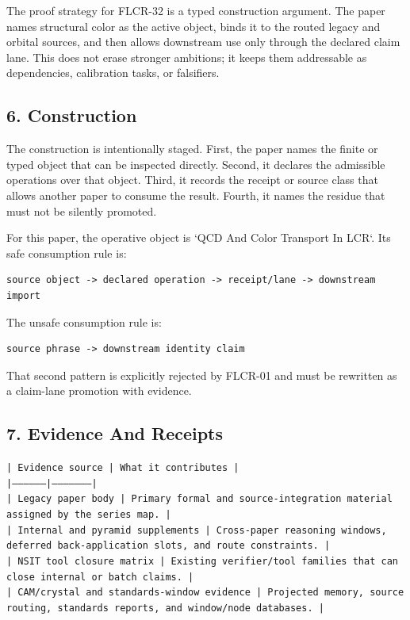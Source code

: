 \documentclass[11pt]{article}
\begin{document}
The proof strategy for FLCR-32 is a typed construction argument. The paper names structural color as the active object, binds it to the routed legacy and orbital sources, and then allows downstream use only through the declared claim lane. This does not erase stronger ambitions; it keeps them addressable as dependencies, calibration tasks, or falsifiers.

\subsection*{6. Construction}

The construction is intentionally staged. First, the paper names the finite or
typed object that can be inspected directly. Second, it declares the admissible
operations over that object. Third, it records the receipt or source class that
allows another paper to consume the result. Fourth, it names the residue that
must not be silently promoted.

For this paper, the operative object is `QCD And Color Transport In LCR`. Its safe consumption
rule is:

\begin{verbatim}
source object -> declared operation -> receipt/lane -> downstream import
\end{verbatim}

The unsafe consumption rule is:

\begin{verbatim}
source phrase -> downstream identity claim
\end{verbatim}

That second pattern is explicitly rejected by FLCR-01 and must be rewritten as
a claim-lane promotion with evidence.

\subsection*{7. Evidence And Receipts}

\noindent\texttt{| Evidence source | What it contributes |}\\
\noindent\texttt{|-----------------|---------------------|}\\
\noindent\texttt{| Legacy paper body | Primary formal and source-integration material assigned by the series map. |}\\
\noindent\texttt{| Internal and pyramid supplements | Cross-paper reasoning windows, deferred back-application slots, and route constraints. |}\\
\noindent\texttt{| NSIT tool closure matrix | Existing verifier/tool families that can close internal or batch claims. |}\\
\noindent\texttt{| CAM/crystal and standards-window evidence | Projected memory, source routing, standards reports, and window/node databases. |}\\
\end{document}
